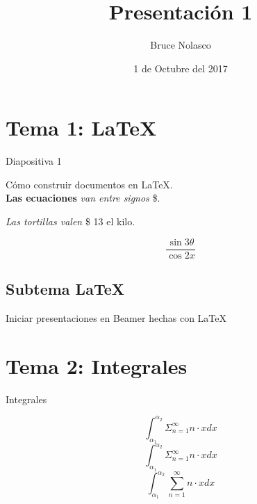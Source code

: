 \documentclass[12pt]{beamer}
\author{Bruce Nolasco}
\title{Presentación 1}
\institute{Facultad de Ciencias UNAM}
\date{1 de Octubre del 2017 }
\begin{document}
\begin{frame}
\titlepage
\end{frame}

\begin{frame}
\tableofcontents
\end{frame}

\section{Tema 1: LaTeX}
\begin{frame}{Diapositiva 1}

Cómo construir documentos en LaTeX. \\

\textbf{Las ecuaciones} \textit{van entre signos} \$.

\emph{Las tortillas valen} \$ 13 el kilo.

\begin{equation}
\frac{\sin{3\theta}}{\cos {2x}}
\end{equation}

\end{frame}
\subsection{Subtema LaTeX}
\begin{frame}
Iniciar presentaciones en Beamer hechas con \LaTeX
\end{frame}

\section{Tema 2: Integrales}
\begin{frame}{Integrales}


\begin{equation}
\displaystyle \int_{\alpha_{1}}^{\alpha_{2}} \Sigma_{n=1}^{\infty} n \cdot x dx
\end{equation}
\begin{equation}
\int_{\alpha_{1}}^{\alpha_{2}} \Sigma_{n=1}^{\infty} n \cdot x dx
\end{equation}
\begin{equation}
\displaystyle \int_{\alpha_{1}}^{\alpha_{2}} 
\displaystyle \sum_{n=1}^{\infty} n \cdot x dx
\end{equation}

\end{frame}
\end{document}
